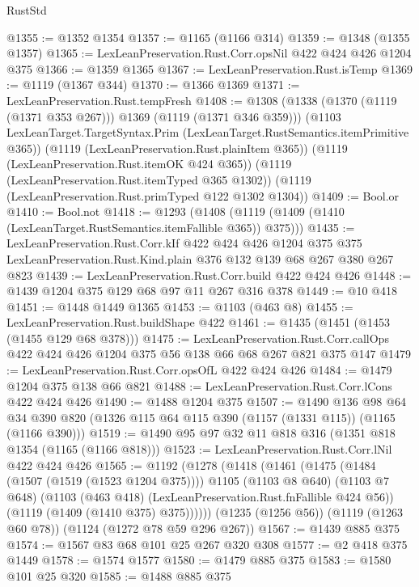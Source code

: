 \begin{lexlean}{RustStd}
\begin{coremodule}
@1355 := @1352 @1354
@1357 := @1165 (@1166 @314)
@1359 := @1348 (@1355 @1357)
@1365 := LexLeanPreservation.Rust.Corr.opsNil @422 @424 @426 @1204 @375
@1366 := @1359 @1365
@1367 := LexLeanPreservation.Rust.isTemp
@1369 := @1119 (@1367 @344)
@1370 := @1366 @1369
@1371 := LexLeanPreservation.Rust.tempFresh
@1408 := @1308
    (@1338 (@1370 (@1119 (@1371 @353 @267))) @1369 (@1119 (@1371 @346 @359)))
    (@1103 LexLeanTarget.TargetSyntax.Prim (LexLeanTarget.RustSemantics.itemPrimitive @365))
    (@1119 (LexLeanPreservation.Rust.plainItem @365))
    (@1119 (LexLeanPreservation.Rust.itemOK @424 @365))
    (@1119 (LexLeanPreservation.Rust.itemTyped @365 @1302))
    (@1119 (LexLeanPreservation.Rust.primTyped @122 @1302 @1304))
@1409 := Bool.or
@1410 := Bool.not
@1418 := @1293 (@1408 (@1119 (@1409 (@1410 (LexLeanTarget.RustSemantics.itemFallible @365)) @375)))
@1435 := LexLeanPreservation.Rust.Corr.kIf
    @422
    @424
    @426
    @1204
    @375
    @375
    LexLeanPreservation.Rust.Kind.plain
    @376
    @132
    @139
    @68
    @267
    @380
    @267
    @823
@1439 := LexLeanPreservation.Rust.Corr.build @422 @424 @426
@1448 := @1439 @1204 @375 @129 @68 @97 @11 @267 @316 @378
@1449 := @10 @418
@1451 := @1448 @1449 @1365
@1453 := @1103 (@463 @8)
@1455 := LexLeanPreservation.Rust.buildShape @422
@1461 := @1435 (@1451 (@1453 (@1455 @129 @68 @378)))
@1475 := LexLeanPreservation.Rust.Corr.callOps
    @422
    @424
    @426
    @1204
    @375
    @56
    @138
    @66
    @68
    @267
    @821
    @375
    @147
@1479 := LexLeanPreservation.Rust.Corr.opsOfL @422 @424 @426
@1484 := @1479 @1204 @375 @138 @66 @821
@1488 := LexLeanPreservation.Rust.Corr.lCons @422 @424 @426
@1490 := @1488 @1204 @375
@1507 := @1490
    @136
    @98
    @64
    @34
    @390
    @820
    (@1326 @115 @64 @115 @390 (@1157 (@1331 @115)) (@1165 (@1166 @390)))
@1519 := @1490 @95 @97 @32 @11 @818 @316 (@1351 @818 @1354 (@1165 (@1166 @818)))
@1523 := LexLeanPreservation.Rust.Corr.lNil @422 @424 @426
@1565 := @1192
    (@1278
      (@1418
        (@1461
          (@1475
            (@1484 (@1507 (@1519 (@1523 @1204 @375))))
            @1105
            (@1103 @8 @640)
            (@1103 @7 @648)
            (@1103 (@463 @418) (LexLeanPreservation.Rust.fnFallible @424 @56))
            (@1119 (@1409 (@1410 @375) @375))))))
    (@1235 (@1256 @56))
    (@1119 (@1263 @60 @78))
    (@1124 (@1272 @78 @59 @296 @267))
@1567 := @1439 @885 @375
@1574 := @1567 @83 @68 @101 @25 @267 @320 @308
@1577 := @2 @418 @375 @1449
@1578 := @1574 @1577
@1580 := @1479 @885 @375
@1583 := @1580 @101 @25 @320
@1585 := @1488 @885 @375

\end{coremodule}
\end{lexlean}
